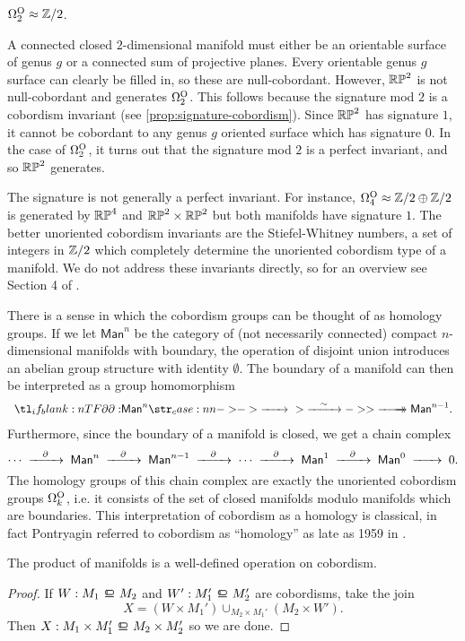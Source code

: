 \begin{example}
	$\Omega_2^{\mathrm{O}}\approx \mathbb{Z}/2$.

	A connected closed $2$-dimensional manifold must either be an orientable surface of genus $g$ or a connected sum of projective planes. Every orientable genus $g$ surface can clearly be filled in, so these are null-cobordant. However, $\mathbb{RP}^2$ is not null-cobordant and generates $\Omega_2^{\mathrm{O}}$. This follows because the signature mod $2$ is a cobordism invariant (see \cref{prop:signature-cobordism}). Since $\mathbb{RP}^2$ has signature $1$, it cannot be cobordant to any genus $g$ oriented surface which has signature $0$. 
	In the case of $\Omega_2^{\mathrm{O}}$, it turns out that the signature mod $2$ is a perfect invariant, and so $\mathbb{RP}^2$ generates.
\end{example}

The signature is not generally a perfect invariant. For instance, $\Omega_4^{\mathrm{O}}\approx \mathbb{Z}/2\oplus \mathbb{Z}/2$ is generated by $\mathbb{RP}^4$ and $\mathbb{RP}^2\times \mathbb{RP}^2$ but both manifolds have signature $1$. The better unoriented cobordism invariants are the Stiefel-Whitney numbers, a set of integers in $\mathbb{Z}/2$ which completely determine the unoriented cobordism type of a manifold. We do not address these invariants directly, so for an overview see Section 4 of \cite{milnorstasheff1974}.

\begin{remark*}
	There is a sense in which the cobordism groups can be thought of as homology groups. If we let $\mathsf{Man}^n$ be the category of (not necessarily connected) compact $n$-dimensional manifolds with boundary, the operation of disjoint union introduces an abelian group structure with identity $\emptyset$.
	The boundary of a manifold can then be interpreted as a group homomorphism
	\[
		\lkxfunc{\partial}{\mathsf{Man}^n}{\mathsf{Man}^{n-1}.}
	\]
	Furthermore, since the boundary of a manifold is closed, we get a chain complex
	\[
		\cdots\lkxto[\partial] \mathsf{Man}^n\lkxto[\partial] \mathsf{Man}^{n-1}\lkxto[\partial]\cdots\lkxto[\partial] \mathsf{Man}^1 \lkxto[\partial] \mathsf{Man}^0 \lkxto 0.
	\]
	The homology groups of this chain complex are exactly the unoriented cobordism groups $\Omega_k^{\mathrm{O}}$, i.e. it consists of the set of closed manifolds modulo manifolds which are boundaries. This interpretation of cobordism as a homology is classical, in fact Pontryagin referred to cobordism as ``homology'' as late as 1959 in \cite{pontryagin1959homotopy}.
\end{remark*}

\begin{proposition}\label{prop:cobordism-product}
	The product of manifolds is a well-defined operation on cobordism.
\end{proposition}
\begin{proof}
	If $W : M_1\bord M_2$ and $W' : M_1'\bord M_2'$ are cobordisms, take the join
	\[
			X = (W\times M_1')\cup_{M_2\times M_1'} (M_2\times W').
	\]
	Then $X : M_1\times M_1' \bord M_2\times M_2'$ so we are done.
\end{proof}

